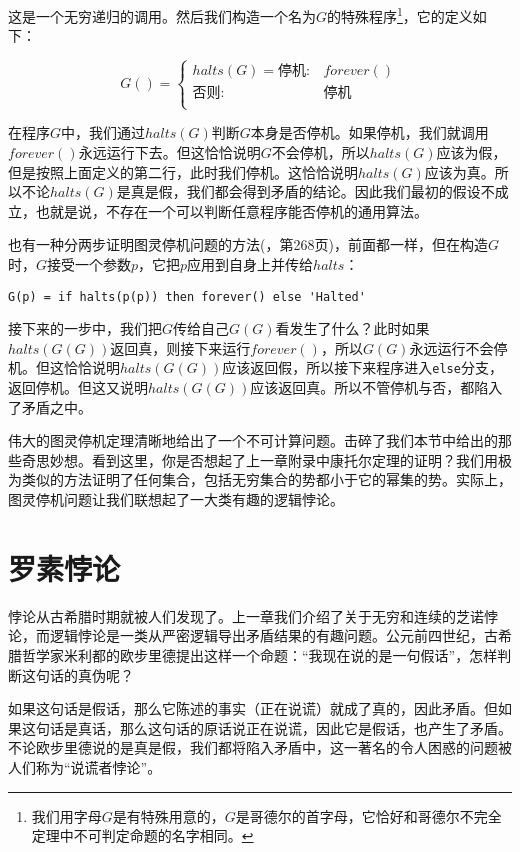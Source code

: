 \documentclass[b5paper]{ctexart}
\begin{document}
这是一个无穷递归的调用。然后我们构造一个名为$G$的特殊程序\footnote{我们用字母$G$是有特殊用意的，$G$是哥德尔的首字母，它恰好和哥德尔不完全定理中不可判定命题的名字相同。}，它的定义如下：

\[
G() = \begin{cases}
halts(G) = \text{停机}: & forever() \\
\text{否则}: & \text{停机} \\
\end{cases}
\]

在程序$G$中，我们通过$halts(G)$判断$G$本身是否停机。如果停机，我们就调用$forever()$永远运行下去。但这恰恰说明$G$不会停机，所以$halts(G)$应该为假，但是按照上面定义的第二行，此时我们停机。这恰恰说明$halts(G)$应该为真。所以不论$halts(G)$是真是假，我们都会得到矛盾的结论。因此我们最初的假设不成立，也就是说，不存在一个可以判断任意程序能否停机的通用算法。

也有一种分两步证明图灵停机问题的方法(\cite{SICP}，第268页)，前面都一样，但在构造$G$时，$G$接受一个参数$p$，它把$p$应用到自身上并传给$halts$：

\lstset{frame=single}
\begin{lstlisting}
G(p) = if halts(p(p)) then forever() else 'Halted'
\end{lstlisting}

接下来的一步中，我们把$G$传给自己$G(G)$看发生了什么？此时如果$halts(G(G))$返回真，则接下来运行$forever()$，所以$G(G)$永远运行不会停机。但这恰恰说明$halts(G(G))$应该返回假，所以接下来程序进入\texttt{else}分支，返回停机。但这又说明$halts(G(G))$应该返回真。所以不管停机与否，都陷入了矛盾之中。

伟大的图灵停机定理清晰地给出了一个不可计算问题。击碎了我们本节中给出的那些奇思妙想。看到这里，你是否想起了上一章附录中康托尔定理的证明？我们用极为类似的方法证明了任何集合，包括无穷集合的势都小于它的幂集的势。实际上，图灵停机问题让我们联想起了一大类有趣的逻辑悖论。

\section{罗素悖论}

悖论从古希腊时期就被人们发现了。上一章我们介绍了关于无穷和连续的芝诺悖论，而逻辑悖论是一类从严密逻辑导出矛盾结果的有趣问题。公元前四世纪，古希腊哲学家米利都的欧步里德提出这样一个命题：“我现在说的是一句假话”，怎样判断这句话的真伪呢？

如果这句话是假话，那么它陈述的事实（正在说谎）就成了真的，因此矛盾。但如果这句话是真话，那么这句话的原话说正在说谎，因此它是假话，也产生了矛盾。不论欧步里德说的是真是假，我们都将陷入矛盾中，这一著名的令人困惑的问题被人们称为“说谎者悖论”。
\end{document}
